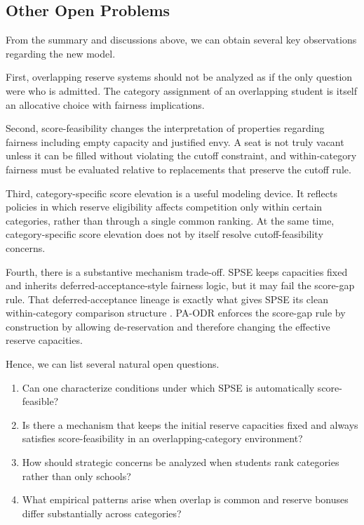 \documentclass[runningheads]{llncs}
\newcommand{\1}{\mathbf{1}}
\begin{document}
\subsection{Other Open Problems}
From the summary and discussions above, we can obtain several key observations regarding the new model.

First, overlapping reserve systems should not be analyzed as if the only question were who is admitted. The category assignment of an overlapping student is itself an allocative choice with fairness implications.

Second, score-feasibility changes the interpretation of properties regarding fairness including empty capacity and justified envy. A seat is not truly vacant unless it can be filled without violating the cutoff constraint, and within-category fairness must be evaluated relative to replacements that preserve the cutoff rule.

Third, category-specific score elevation is a useful modeling device. It reflects policies in which reserve eligibility affects competition only within certain categories, rather than through a single common ranking. At the same time, category-specific score elevation does not by itself resolve cutoff-feasibility concerns.

Fourth, there is a substantive mechanism trade-off. SPSE keeps capacities fixed and inherits deferred-acceptance-style fairness logic, but it may fail the score-gap rule. That deferred-acceptance lineage is exactly what gives SPSE its clean within-category comparison structure \cite{GaSh62a,AbSo03b,Roth08a}. PA-ODR enforces the score-gap rule by construction by allowing de-reservation and therefore changing the effective reserve capacities.

Hence, we can list several natural open questions.

\begin{enumerate}
\item Can one characterize conditions under which SPSE is automatically score-feasible?
\item Is there a mechanism that keeps the initial reserve capacities fixed and always satisfies score-feasibility in an overlapping-category environment?
\item How should strategic concerns be analyzed when students rank categories rather than only schools?
\item What empirical patterns arise when overlap is common and reserve bonuses differ substantially across categories?
\end{enumerate}
\end{document}
